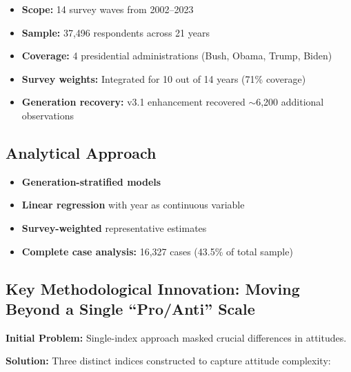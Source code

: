 \documentclass[11pt,letterpaper]{article}
\begin{document}
\begin{itemize}
    \item \textbf{Scope:} 14 survey waves from 2002–2023
    \item \textbf{Sample:} 37,496 respondents across 21 years
    \item \textbf{Coverage:} 4 presidential administrations (Bush, Obama, Trump, Biden)
    \item \textbf{Survey weights:} Integrated for 10 out of 14 years (71\% coverage)
    \item \textbf{Generation recovery:} v3.1 enhancement recovered $\sim$6,200 additional observations
\end{itemize}

\subsection{Analytical Approach}
\begin{itemize}
    \item \textbf{Generation-stratified models}
    \item \textbf{Linear regression} with year as continuous variable
    \item \textbf{Survey-weighted} representative estimates
    \item \textbf{Complete case analysis:} 16,327 cases (43.5\% of total sample)
\end{itemize}

\subsection{Key Methodological Innovation: Moving Beyond a Single ``Pro/Anti'' Scale}

\textbf{Initial Problem:} Single-index approach masked crucial differences in attitudes.

\textbf{Solution:} Three distinct indices constructed to capture attitude complexity:
\end{document}
